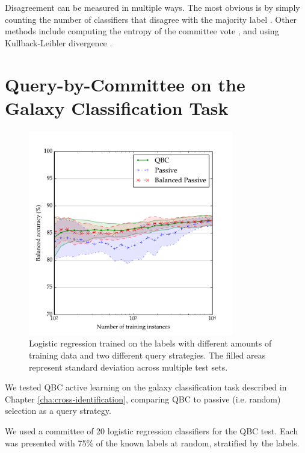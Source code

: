         Disagreement can be measured in multiple ways. The most obvious is by
        simply counting the number of classifiers that disagree with the
        majority label \citep{seung92}. Other methods include computing the
        entropy of the committee vote \citep{mccallum98, dagan95}, and using
        Kullback-Leibler divergence \citep{mccallum98}.

\section{Query-by-Committee on the Galaxy Classification Task}
\label{sec:rgz-qbc}

    \begin{figure}
        \centering
        \includegraphics[width=0.8\textwidth]
            {images/experiments/rgz_qbc.pdf}
        \caption{Logistic regression trained on the \citeauthor{norris06}
            labels with different amounts of training data and two different
            query strategies. The filled areas represent standard deviation
            across multiple test sets.}
        \label{fig:rgz-qbc}
    \end{figure}

    We tested QBC active learning on the galaxy classification task described in
    Chapter \ref{cha:cross-identification}, comparing QBC to passive (i.e.
    random) selection as a query strategy.

    We used a committee of 20 logistic regression classifiers for the QBC test.
    Each was presented with 75\% of the known labels at random, stratified by
    the labels.

